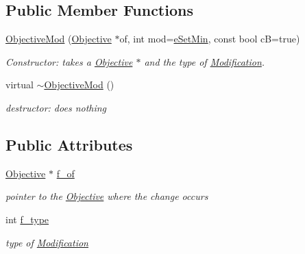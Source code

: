 \subsection*{Public Member Functions}
\begin{DoxyCompactItemize}
\item 
\mbox{\hyperlink{class_s_m_spp__di__unipi__it_1_1_objective_mod_a91e9e56853e9fe7cacbfb0c9348d3fcf}{Objective\+Mod}} (\mbox{\hyperlink{class_s_m_spp__di__unipi__it_1_1_objective}{Objective}} $\ast$of, int mod=\mbox{\hyperlink{class_s_m_spp__di__unipi__it_1_1_objective_mod_addf23a536d33ccbb3c19b1d46e514b9dad8938f67f0bad1270a7cd6bf31af9fe5}{e\+Set\+Min}}, const bool cB=true)
\begin{DoxyCompactList}\small\item\em Constructor\+: takes a \mbox{\hyperlink{class_s_m_spp__di__unipi__it_1_1_objective}{Objective}} $\ast$ and the type of \mbox{\hyperlink{class_s_m_spp__di__unipi__it_1_1_modification}{Modification}}. \end{DoxyCompactList}\item 
\mbox{\label{class_s_m_spp__di__unipi__it_1_1_objective_mod_a222c5809b9801449be4569d6334d96e3}} 
virtual \mbox{\hyperlink{class_s_m_spp__di__unipi__it_1_1_objective_mod_a222c5809b9801449be4569d6334d96e3}{$\sim$\+Objective\+Mod}} ()
\begin{DoxyCompactList}\small\item\em destructor\+: does nothing \end{DoxyCompactList}\end{DoxyCompactItemize}
\subsection*{Public Attributes}
\begin{DoxyCompactItemize}
\item 
\mbox{\label{class_s_m_spp__di__unipi__it_1_1_objective_mod_a485c69dfb6c837f9af53294a4c433948}} 
\mbox{\hyperlink{class_s_m_spp__di__unipi__it_1_1_objective}{Objective}} $\ast$ \mbox{\hyperlink{class_s_m_spp__di__unipi__it_1_1_objective_mod_a485c69dfb6c837f9af53294a4c433948}{f\+\_\+of}}
\begin{DoxyCompactList}\small\item\em pointer to the \mbox{\hyperlink{class_s_m_spp__di__unipi__it_1_1_objective}{Objective}} where the change occurs \end{DoxyCompactList}\item 
\mbox{\label{class_s_m_spp__di__unipi__it_1_1_objective_mod_a102e30a031044d9e821316a075e882b1}} 
int \mbox{\hyperlink{class_s_m_spp__di__unipi__it_1_1_objective_mod_a102e30a031044d9e821316a075e882b1}{f\+\_\+type}}
\begin{DoxyCompactList}\small\item\em type of \mbox{\hyperlink{class_s_m_spp__di__unipi__it_1_1_modification}{Modification}} \end{DoxyCompactList}\end{DoxyCompactItemize}
